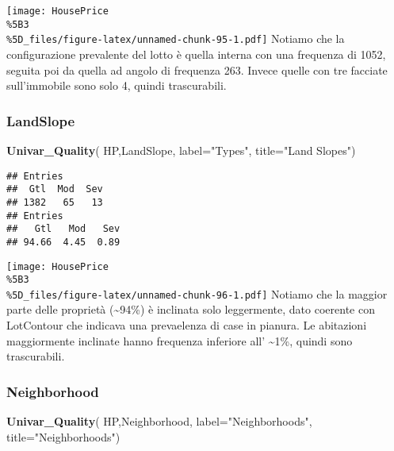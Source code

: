 \documentclass[
]{article}
\newenvironment{Shaded}{\begin{snugshade}}{\end{snugshade}}
\newcommand{\AttributeTok}[1]{\textcolor[rgb]{0.13,0.29,0.53}{#1}}
\newcommand{\FunctionTok}[1]{\textcolor[rgb]{0.13,0.29,0.53}{\textbf{#1}}}
\newcommand{\NormalTok}[1]{#1}
\newcommand{\StringTok}[1]{\textcolor[rgb]{0.31,0.60,0.02}{#1}}
\begin{document}
\texttt{[image: HousePrice\\\%5B3\\\%5D\_files/figure-latex/unnamed-chunk-95-1.pdf]}
Notiamo che la configurazione prevalente del lotto è quella interna con
una frequenza di 1052, seguita poi da quella ad angolo di frequenza 263.
Invece quelle con tre facciate sull'immobile sono solo 4, quindi
trascurabili.

\subsubsection{LandSlope}\label{landslope}

\begin{Shaded}
\begin{Highlighting}[]
\FunctionTok{Univar\_Quality}\NormalTok{(}
\NormalTok{  HP,LandSlope,}
  \AttributeTok{label=}\StringTok{"Types"}\NormalTok{,}
  \AttributeTok{title=}\StringTok{"Land Slopes"}\NormalTok{)}
\end{Highlighting}
\end{Shaded}

\begin{verbatim}
## Entries
##  Gtl  Mod  Sev 
## 1382   65   13 
## Entries
##   Gtl   Mod   Sev 
## 94.66  4.45  0.89
\end{verbatim}

\texttt{[image: HousePrice\\\%5B3\\\%5D\_files/figure-latex/unnamed-chunk-96-1.pdf]}
Notiamo che la maggior parte delle proprietà (\textasciitilde94\%) è
inclinata solo leggermente, dato coerente con LotContour che indicava
una prevaelenza di case in pianura. Le abitazioni maggiormente inclinate
hanno frequenza inferiore all' \textasciitilde1\%, quindi sono
trascurabili.

\subsubsection{Neighborhood}\label{neighborhood}

\begin{Shaded}
\begin{Highlighting}[]
\FunctionTok{Univar\_Quality}\NormalTok{(}
\NormalTok{  HP,Neighborhood, }
  \AttributeTok{label=}\StringTok{"Neighborhoods"}\NormalTok{,}
  \AttributeTok{title=}\StringTok{"Neighborhoods"}\NormalTok{)}
\end{Highlighting}
\end{Shaded}
\end{document}
